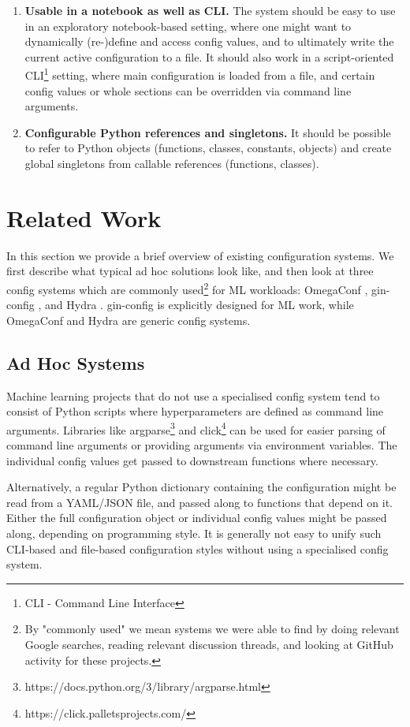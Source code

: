 \documentclass{itatnew}
\begin{document}
\begin{enumerate}
    \item \textbf{Usable in a notebook as well as CLI.} The system should be easy to use in an exploratory notebook-based setting, where one might want to dynamically (re-)define and access config values, and to ultimately write the current active configuration to a file. It should also work in a script-oriented CLI\footnote{CLI - Command Line Interface} setting, where main configuration is loaded from a file, and certain config values or whole sections can be overridden via command line arguments.
    \item \textbf{Configurable Python references and singletons.} It should be possible to refer to Python objects (functions, classes, constants, objects) and create global singletons from callable references (functions, classes).
\end{enumerate}


\section{Related Work}

In this section we provide a brief overview of existing configuration systems.
We first describe what typical ad hoc solutions look like, and then look at three config systems which are commonly used\footnote{By "commonly used" we mean systems we were able to find by doing relevant Google searches, reading relevant discussion threads, and looking at GitHub activity for these projects.} for ML workloads: OmegaConf \cite{OmegaConf}, gin-config \cite{gin-config}, and Hydra \cite{hydra}.
gin-config is explicitly designed for ML work, while OmegaConf and Hydra are generic config systems.

\subsection{Ad Hoc Systems}

Machine learning projects that do not use a specialised config system tend to consist of Python scripts where hyperparameters are defined as command line arguments.
Libraries like argparse\footnote{https://docs.python.org/3/library/argparse.html} and click\footnote{https://click.palletsprojects.com/} can be used for easier parsing of command line arguments or providing arguments via environment variables.
The individual config values get passed to downstream functions where necessary.

Alternatively, a regular Python dictionary containing the configuration might be read from a YAML/JSON file, and passed along to functions that depend on it.
Either the full configuration object or individual config values might be passed along, depending on programming style.
It is generally not easy to unify such CLI-based and file-based configuration styles without using a specialised config system.
\end{document}

